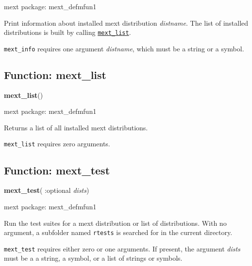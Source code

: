 \documentclass[]{article}
\begin{document}
\noindent mext package: mext\_defmfun1



\vspace{5 pt}
Print information about installed mext distribution {\it distname}. The list of installed distributions is built by calling \hyperlink{mext_list}{{\tt mext\_list}}. 

\vspace{5 pt}

   {\tt mext\_info} requires one argument {\it distname}, which must be a string or a symbol.


\vspace{5 pt}


\subsection{Function: mext\_list\label{sec:mext_list}}
\hypertarget{mext_list}{}
{\bf mext\_list}()


\noindent mext package: mext\_defmfun1



\vspace{5 pt}
Returns a list of all installed mext distributions. 

\vspace{5 pt}

   {\tt mext\_list} requires zero arguments.


\vspace{5 pt}


\subsection{Function: mext\_test\label{sec:mext_test}}
\hypertarget{mext_test}{}
{\bf mext\_test}( :optional {\it dists})


\noindent mext package: mext\_defmfun1



\vspace{5 pt}
Run the test suites for a mext distribution or list of distributions. With no argument, a subfolder named \verb#rtests# is searched for in the current directory. 

\vspace{5 pt}

   {\tt mext\_test} requires either zero or one arguments. If present, the argument {\it dists} must be a  a string, a symbol, or a list of strings or symbols.
\end{document}
